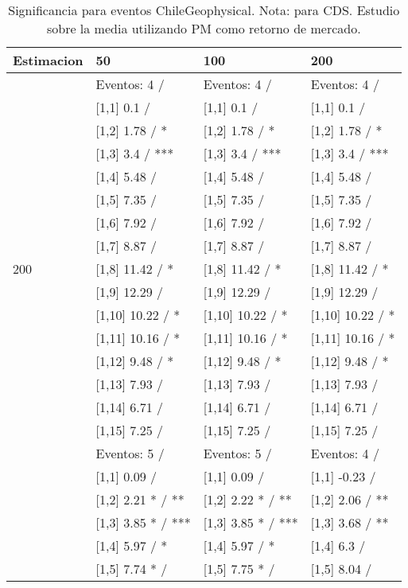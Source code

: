 \begin{table}

\caption{Significancia para eventos ChileGeophysical. Nota: para CDS. Estudio sobre la media utilizando PM como retorno de mercado.}
\centering
\begin{tabular}[t]{llll}
\toprule
Estimacion & 50 & 100 & 200\\
\midrule
 & Eventos:  4 / & Eventos:  4 / & Eventos:  4 /\\
 & {}[1,1] 0.1  / & {}[1,1] 0.1  / & {}[1,1] 0.1  /\\
 & {}[1,2] 1.78  / * & {}[1,2] 1.78  / * & {}[1,2] 1.78  / *\\
 & {}[1,3] 3.4  / *** & {}[1,3] 3.4  / *** & {}[1,3] 3.4  / ***\\
 & {}[1,4] 5.48  / & {}[1,4] 5.48  / & {}[1,4] 5.48  /\\
\addlinespace
 & {}[1,5] 7.35  / & {}[1,5] 7.35  / & {}[1,5] 7.35  /\\
 & {}[1,6] 7.92  / & {}[1,6] 7.92  / & {}[1,6] 7.92  /\\
 & {}[1,7] 8.87  / & {}[1,7] 8.87  / & {}[1,7] 8.87  /\\
200 & {}[1,8] 11.42  / * & {}[1,8] 11.42  / * & {}[1,8] 11.42  / *\\
 & {}[1,9] 12.29  / & {}[1,9] 12.29  / & {}[1,9] 12.29  /\\
\addlinespace
 & {}[1,10] 10.22  / * & {}[1,10] 10.22  / * & {}[1,10] 10.22  / *\\
 & {}[1,11] 10.16  / * & {}[1,11] 10.16  / * & {}[1,11] 10.16  / *\\
 & {}[1,12] 9.48  / * & {}[1,12] 9.48  / * & {}[1,12] 9.48  / *\\
 & {}[1,13] 7.93  / & {}[1,13] 7.93  / & {}[1,13] 7.93  /\\
 & {}[1,14] 6.71  / & {}[1,14] 6.71  / & {}[1,14] 6.71  /\\
\addlinespace
 & {}[1,15] 7.25  / & {}[1,15] 7.25  / & {}[1,15] 7.25  /\\
 & Eventos:  5 / & Eventos:  5 / & Eventos:  4 /\\
 & {}[1,1] 0.09  / & {}[1,1] 0.09  / & {}[1,1] -0.23  /\\
 & {}[1,2] 2.21 * / ** & {}[1,2] 2.22 * / ** & {}[1,2] 2.06  / **\\
 & {}[1,3] 3.85 * / *** & {}[1,3] 3.85 * / *** & {}[1,3] 3.68  / **\\
\addlinespace
 & {}[1,4] 5.97  / * & {}[1,4] 5.97  / * & {}[1,4] 6.3  /\\
 & {}[1,5] 7.74 * / & {}[1,5] 7.75 * / & {}[1,5] 8.04  /\\

\end{tabular}
\end{table}
